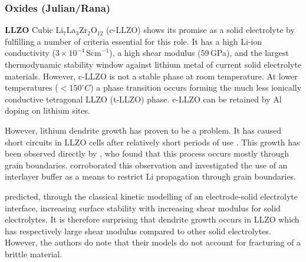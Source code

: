 \documentclass[../main.tex]{subfiles}
\begin{document}
\subsubsection{Oxides (Julian/Rana)}
\label{sec:se_oxides}


\textbf{LLZO} Cubic Li$_7$La$_3$Zr$_2$O$_{12}$ (c-LLZO) shows its promise as a solid electrolyte by fulfilling a number of criteria essential for this role. It has a high Li-ion conductivity (\(3\times 10^{-4}\,\mathrm{Scm}^{-1}\))\cite{Murugan2007}, a high shear modulus (59\,GPa)\cite{Ni2012}, and the largest thermodynamic stability window against lithium metal\cite{Zhu2016, Binninger2020} of current solid electrolyte materials. However, c-LLZO is not a stable phase at room temperature.\cite{Geiger2011} At lower temperatures (\(<150 ^\circ C\)) a phase transition occurs forming the much less ionically conductive tetragonal LLZO (t-LLZO) phase.\cite{Geiger2011} c-LLZO can be retained by Al doping on lithium sites.\cite{Geiger2011, Rangasamy2012}

However, lithium dendrite growth has proven to be a problem. It has caused short circuits in LLZO cells after relatively short periods of use \cite{Ren2015,Sudo2014}. This growth has been observed directly by \citeauthor{Cheng2017}, who found that this process occurs mostly through grain boundaries.\cite{Cheng2017} \citeauthor{Kim2020} corroborated this observation and investigated the use of an interlayer buffer as a means to restrict Li propagation through grain boundaries.\cite{Kim2020}

\citeauthor{Monroe2004} predicted, through the classical kinetic modelling of an electrode-solid electrolyte interface, increasing surface stability with increasing shear modulus for solid electrolytes.\cite{Monroe2004, Monroe2005} It is therefore surprising that dendrite growth occurs in LLZO which has respectively large shear modulus compared to other solid electrolytes. However, the authors do note that their models do not account for fracturing of a brittle material.
\end{document}
